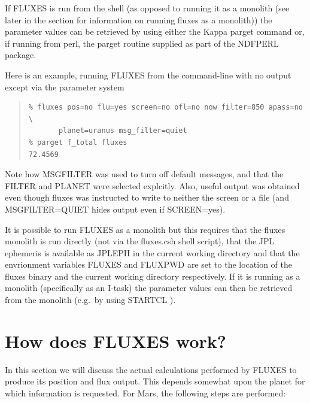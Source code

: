 \documentclass[11pt,twoside]{article}
\newenvironment{myquote}{\begin{quote}\begin{small}}{\end{small}\end{quote}}
\newcommand{\xref}[3]{#1}
\newcommand{\xlabel}[1]{}
\renewcommand{\_}{\texttt{\symbol{95}}}
\begin{document}
If FLUXES is run from the shell (as opposed to running it as a
monolith (see later in the section for information on running fluxes
as a monolith)) the parameter values can be retrieved by using either
the \xref{Kappa}{sun95}{} \xref{parget}{sun95}{PARGET} command
or, if running from perl, the par\_get routine supplied as part of the
\xref{NDFPERL}{sun222}{} package.

Here is an example, running FLUXES from the command-line with
no output except via the parameter system

\begin{myquote}
\begin{verbatim}
% fluxes pos=no flu=yes screen=no ofl=no now filter=850 apass=no \
       planet=uranus msg_filter=quiet
% parget f_total fluxes
72.4569
\end{verbatim}
\end{myquote}

Note how MSG\_FILTER was used to turn off default messages, and
that the FILTER and PLANET were selected explcitly. Also, useful
output was obtained even though fluxes was instructed to write
to neither the screen or a file (and MSG\_FILTER=QUIET hides
output even if SCREEN=yes).


It is possible to run FLUXES as a monolith but this requires
that the fluxes monolith is run directly (not via the fluxes.csh
shell script), that the JPL ephemeris is available as JPLEPH in the
current working directory and that the envrionment variables
FLUXES and FLUXPWD are set to the location of the fluxes binary
and the current working directory respectively. If it is running
as a monolith (specifically as an I-task) the parameter values can
then be retrieved from the monolith (e.g.\ by using
\xref{STARTCL}{sun186}{adam_message_system_extension} ).

\section{How does FLUXES work?}
\xlabel{howfluxesworks}
\label{sec:howfluxesworks}

In this section we will discuss the actual calculations performed by FLUXES to produce its position and flux output.  This depends somewhat upon the planet for which information is requested.  For Mars, the following steps are performed:
\end{document}
